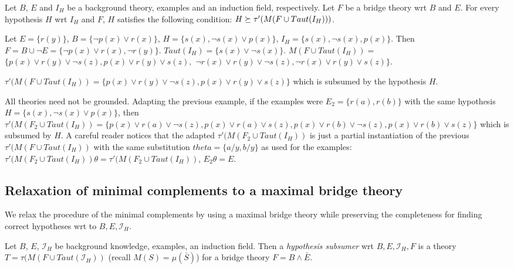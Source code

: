 \begin{conjecture}\label{subsumptionConjectureFirstOrder}
Let $B$, $E$ and $I_H$ be a background theory, examples and an induction field, respectively. Let $F$ be a bridge theory wrt $B$ and $E$. For every hypothesis $H$ wrt $I_H$ and $F$, $H$ satisfies the following condition:
$H \succeq \tau'(M(F \cup Taut(I_H)))$.
\end{conjecture}

\begin{exmp}
Let $E=\{r(y)\}$,
$B=\{\neg p(x) \vee r(x)\}$,
$H=\{s(x), \neg s(x) \vee p(x)\}$,
$I_H=\{s(x), \neg s(x), p(x)\}$.
Then $F=B \cup \neg E=\{\neg p(x) \vee r(x), \neg r(y) \}$.
$Taut(I_H)=\{s(x) \vee \neg s(x)\}$.
$M(F \cup Taut(I_H))=$
$\{p(x) \vee r(y) \vee \neg s(z), p(x) \vee r(y) \vee s(z),$
$\neg r(x) \vee r(y) \vee \neg s(z),\neg r(x) \vee r(y) \vee s(z) \}$.

$\tau'(M(F \cup Taut(I_H))=\{p(x) \vee r(y) \vee \neg s(z), p(x) \vee r(y) \vee s(z)\}$ which is subsumed by the hypothesis $H$.
\end{exmp}

\begin{exmp}
All theories need not be grounded. Adapting the previous example, if the examples were
$E_2=\{r(a), r(b)\}$ with the same hypothesis
$H=\{s(x), \neg s(x) \vee p(x)\}$, then
$\tau'(M(F_2 \cup Taut(I_H))=\{p(x) \vee r(a) \vee \neg s(z), p(x) \vee r(a) \vee s(z), p(x) \vee r(b) \vee \neg s(z), p(x) \vee r(b) \vee s(z) \}$ which is subsumed by $H$. A careful reader notices that the adapted $\tau'(M(F_2 \cup Taut(I_H))$ is just a partial instantiation of the previous
$\tau'(M(F \cup Taut(I_H))$ with the same substitution
$theta=\{a / y, b / y\}$ as used for the examples:
$\tau'(M(F_2 \cup Taut(I_H)) \theta=\tau'(M(F_2 \cup Taut(I_H))$,
$E_2 \theta = E$.
\end{exmp}

\subsection{Relaxation of minimal complements to a maximal bridge theory}
We relax the procedure of the minimal complements by using a maximal bridge theory while preserving the completeness for finding correct hypotheses wrt to $B, E, \mathcal{I}_H$.

\begin{defn}
Let $B$, $E$, $\mathcal{I}_H$ be background knowledge, examples, an induction field. Then a \emph{hypothesis subsumer} wrt $B, E, \mathcal{I}_H, F$ is a theory
$T=\tau(M(F \cup Taut(\mathcal{I}_H))$ (recall $M(S)=\mu(\bar{S})$) for a bridge theory $F=B \land \bar{E}$.
\end{defn}

